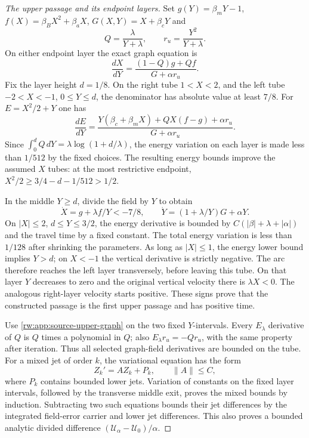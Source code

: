 \begin{proof}[The upper passage and its endpoint layers]
Set $g(Y)=\beta_mY-1$, $f(X)=\beta_BX^2+\beta_aX$,
$G(X,Y)=X+\beta_cY$ and
\[
 Q=\frac{\lambda}{Y+\lambda},\qquad
 r_u=\frac{Y^2}{Y+\lambda}.
\]
On either endpoint layer the exact graph equation is
\begin{equation}\label{rw:app:source-upper-graph}
 \frac{dX}{dY}=\frac{(1-Q)g+Qf}{G+\alpha r_u}.
\end{equation}
Fix the layer height $d=1/8$. On the right tube $1<X<2$,
and the left tube $-2<X<-1$, $0\le Y\le d$, the denominator
has absolute value at least $7/8$. For $E=X^2/2+Y$ one has
\[
 \frac{dE}{dY}
 =\frac{Y(\beta_c+\beta_mX)+QX(f-g)+\alpha r_u}
                {G+\alpha r_u}.
\]
Since
$\int_0^d Q\,dY=\lambda\log(1+d/\lambda)$,
the energy variation on each layer is made less than $1/512$
by the fixed choices. The resulting energy bounds improve the assumed
$X$ tubes: at the most restrictive endpoint,
$X^2/2\ge3/4-d-1/512>1/2$.

In the middle $Y\ge d$, divide the field by $Y$ to obtain
\[
 \dot X=g+\lambda f/Y<-7/8,\qquad
 \dot Y=(1+\lambda/Y)G+\alpha Y.
\]
On $|X|\le2$, $d\le Y\le3/2$, the energy derivative is bounded
by $C(|\beta|+\lambda+|\alpha|)$ and the travel time by a fixed
constant. The total energy variation is less than $1/128$ after
shrinking the parameters. As long as $|X|\le1$, the energy lower
bound implies $Y>d$; on $X<-1$ the vertical derivative is strictly
negative. The arc therefore reaches the left layer transversely,
before leaving this tube. On that layer $Y$ decreases to zero and
the original vertical velocity there is $\lambda X<0$. The analogous
right-layer velocity starts positive. These signs prove that the
constructed passage is the first upper passage and has positive time.

Use \eqref{rw:app:source-upper-graph} on the two fixed $Y$-intervals.
Every $E_\lambda$ derivative of
$Q$ is $Q$ times a polynomial in $Q$; also
$E_\lambda r_u=-Qr_u$, with the same property after iteration.
Thus all selected graph-field derivatives are bounded on the tube.
For a mixed jet of order $k$, the variational equation has the form
\begin{equation}\label{rw:app:bounded-variation}
 Z_k'=AZ_k+P_k,\qquad \|A\|\le C,
\end{equation}
where $P_k$ contains bounded lower jets. Variation of constants on the
fixed layer intervals, followed by the transverse middle exit, proves
the mixed bounds by induction. Subtracting two such equations bounds
their jet differences by the integrated field-error carrier and lower
jet differences. This also proves a bounded analytic divided difference
$(\mathcal U_\alpha-\mathcal U_0)/\alpha$.
\end{proof}

